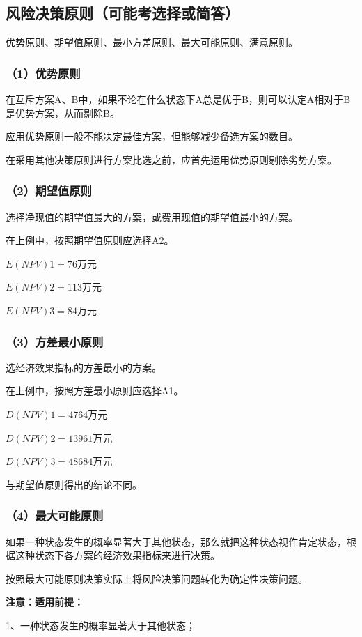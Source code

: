 \subsection{风险决策原则（可能考选择或简答）}
优势原则、期望值原则、最小方差原则、最大可能原则、满意原则。

\subsubsection{（1）优势原则}
在互斥方案A、B中，如果不论在什么状态下A总是优于B，则可以认定A相对于B是优势方案，从而剔除B。

应用优势原则一般不能决定最佳方案，但能够减少备选方案的数目。

在采用其他决策原则进行方案比选之前，应首先运用优势原则剔除劣势方案。

\subsubsection{（2）期望值原则}
选择净现值的期望值最大的方案，或费用现值的期望值最小的方案。

在上例中，按照期望值原则应选择A2。

$E(NPV)1=76$万元

$E(NPV)2=113$万元

$E(NPV)3=84$万元

\subsubsection{（3）方差最小原则}
选经济效果指标的方差最小的方案。

在上例中，按照方差最小原则应选择A1。

$D(NPV)1=4764$万元

$D(NPV)2=13961$万元

$D(NPV)3=48684$万元

与期望值原则得出的结论不同。

\subsubsection{（4）最大可能原则}
如果一种状态发生的概率显著大于其他状态，那么就把这种状态视作肯定状态，根据这种状态下各方案的经济效果指标来进行决策。

按照最大可能原则决策实际上将风险决策问题转化为确定性决策问题。

\noindent \textbf{注意：适用前提：}

1、一种状态发生的概率显著大于其他状态；

